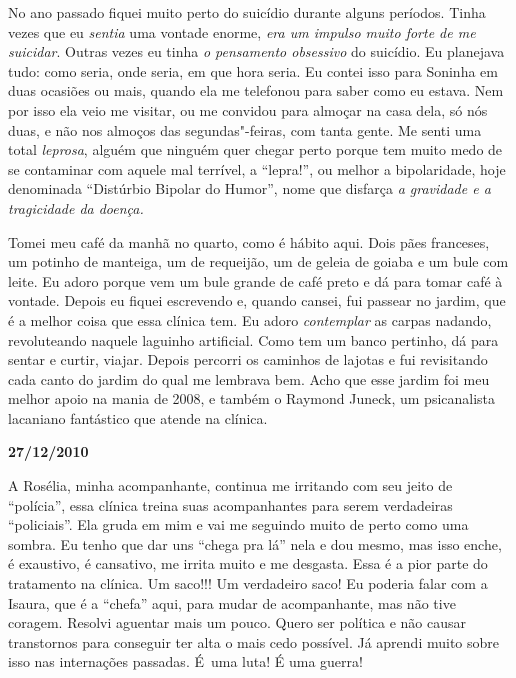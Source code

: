 No ano passado fiquei muito perto do suicídio durante alguns períodos.
Tinha vezes que eu \emph{sentia} uma vontade enorme, \emph{era um
impulso muito forte de me suicidar}. Outras vezes eu tinha \emph{o
pensamento obsessivo}\textbf{} do suicídio. Eu planejava tudo: como
seria, onde seria, em que hora seria. Eu contei isso para Soninha em
duas ocasiões ou mais, quando ela me telefonou para saber como eu
estava. Nem por isso ela veio me visitar, ou me convidou para almoçar na
casa dela, só nós duas, e não nos almoços das segundas"-feiras, com tanta
gente. Me senti uma total \emph{leprosa}, alguém que ninguém quer chegar
perto porque tem muito medo de se contaminar com aquele mal terrível, a
``lepra!'', ou melhor a bipolaridade, hoje denominada ``Distúrbio
Bipolar do Humor'', nome que disfarça \emph{a gravidade e a tragicidade
da doença.}

Tomei meu café da manhã no quarto, como é hábito aqui. Dois pães
franceses, um potinho de manteiga, um de requeijão, um de geleia de
goiaba e um bule com leite. Eu adoro porque vem um bule grande de café
preto e dá para tomar café à vontade. Depois eu fiquei escrevendo e,
quando cansei, fui passear no jardim, que é a melhor coisa que essa
clínica tem. Eu adoro \emph{contemplar} as carpas nadando, revoluteando
naquele laguinho artificial. Como tem um banco pertinho, dá para sentar
e curtir, viajar. Depois percorri os caminhos de lajotas e fui
revisitando cada canto do jardim do qual me lembrava bem. Acho que esse
jardim foi meu melhor apoio na mania de 2008, e também o Raymond Juneck,
um psicanalista lacaniano fantástico que atende na clínica.

\begin{flushright}\textbf{27/12/2010}\end{flushright}


A Rosélia, minha acompanhante, continua me irritando com seu jeito de
``polícia'', essa clínica treina suas acompanhantes para serem
verdadeiras ``policiais''. Ela gruda em mim e vai me seguindo muito de
perto como uma sombra. Eu tenho que dar uns ``chega pra lá'' nela e dou
mesmo, mas isso enche, é exaustivo, é cansativo, me irrita muito e me
desgasta. Essa é a pior parte do tratamento na clínica. Um saco!!! Um
verdadeiro saco! Eu poderia falar com a Isaura, que é a ``chefa'' aqui,
para mudar de acompanhante, mas não tive coragem. Resolvi aguentar mais
um pouco. Quero ser política e não causar transtornos para conseguir ter
alta o mais cedo possível. Já aprendi muito sobre isso nas internações
passadas. É~uma luta! É uma guerra!

